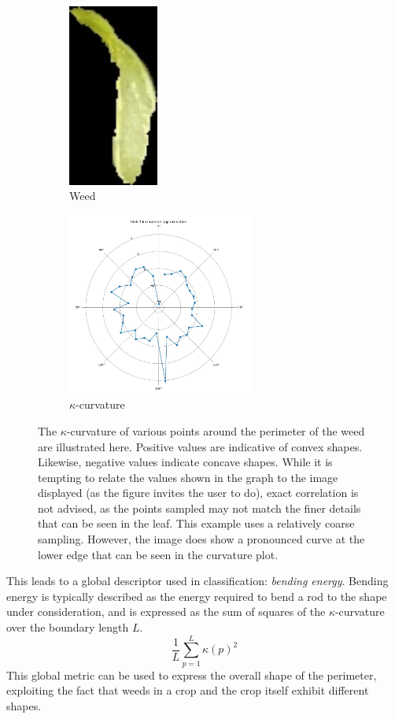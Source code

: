 \documentclass[letterpaper, notitlepage]{report}
\begin{document}
{  \begin{figure}[h!]
	\centering
	\begin{subfigure}[h]{.4\textwidth}
	  \centering
	  \includegraphics[height=6cm]{./figures/for-curvature-blob-1.jpg}
	  \caption{Weed}
	  \label{fig:curvature-weed}
	\end{subfigure}
	\begin{subfigure}[h]{.4\textwidth}
	  \centering
	  \includegraphics[height=6cm]{./figures/curvature-blob-1.jpg}
	  \caption{$\kappa$-curvature}
	  \label{fig:curvature-plot}
	\end{subfigure}
	\caption[Example of $\kappa$-curvature]{The $\kappa$-curvature of various points around the perimeter of the weed are illustrated here. Positive values are indicative of convex shapes. Likewise, negative values indicate concave shapes.  While it is tempting to relate the values shown in the graph to the image displayed (as the figure invites the user to do), exact correlation is not advised, as the points sampled may not match the finer details that can be seen in the leaf. This example uses a relatively coarse sampling. However, the image does show a pronounced curve at the lower edge that can be seen in the curvature plot.}
	\label{fig:curvature}
\end{figure}
This leads to a global descriptor used in classification: \textit{bending energy}. Bending energy is typically described as the energy required to bend a rod to the shape under consideration, and is expressed as the sum of squares of the $\kappa$-curvature over the boundary length $L$.
\begin{equation}
\frac{1}{L} \sum_{p=1}^{L}\kappa(p)^2
\end{equation}
This global metric can be used to express the overall shape of the perimeter, exploiting the fact that weeds in a crop and the crop itself exhibit different shapes.

}
\end{document}
